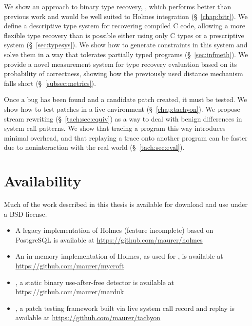 We show an approach to binary type recovery, \bitr, which performs better than previous work and would be well suited to Holmes integration (\S~\ref{chap:bitr}).
We define a descriptive type system for recovering compiled C code, allowing a more flexible type recovery than is possible either using only C types or a prescriptive system (\S~\ref{sec:typesys}).
We show how to generate constraints in this system and solve them in a way that tolerates partially typed programs (\S~\ref{sec:infmeth}).
We provide a novel measurement system for type recovery evaluation based on its probability of correctness, showing how the previously used distance mechanism falls short (\S~\ref{subsec:metrics}).

Once a bug has been found and a candidate patch created, it must be tested.
We show how to test patches in a live environment (\S~\ref{chap:tachyon}).
We propose stream rewriting (\S~\ref{tach:sec:equiv}) as a way to deal with benign differences in system call patterns.
We show that tracing a program this way introduces minimal overhead, and that replaying a trace onto another program can be faster due to noninteraction with the real world (\S~\ref{tach:sec:eval}).

\section{Availability}
Much of the work described in this thesis is available for download and use under a BSD license.
\begin{itemize}
\item A legacy implementation of Holmes (feature incomplete) based on PostgreSQL is available at \url{https://github.com/maurer/holmes}
\item An in-memory implementation of Holmes, as used for \aliasname, is available at \url{https://github.com/maurer/mycroft}
\item \aliasname, a static binary use-after-free detector is available at\\ \url{https://github.com/maurer/marduk}
\item \tachyon, a patch testing framework built via live system call record and replay is available at \url{https://github.com/maurer/tachyon}
\end{itemize}
